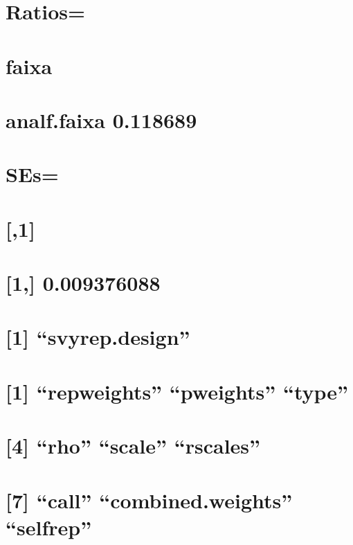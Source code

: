\documentclass[]{book}
\theoremstyle{definition}
\theoremstyle{definition}
\theoremstyle{definition}
\theoremstyle{remark}
\begin{document}
\section{Ratios=}\label{ratios-4}

\section{faixa}\label{faixa-4}

\section{analf.faixa 0.118689}\label{analf.faixa-0.118689-2}

\section{SEs=}\label{ses-4}

\section{{[},1{]}}\label{section-13}

\section{{[}1,{]} 0.009376088}\label{section-14}

\section{\texorpdfstring{{[}1{]}
``svyrep.design''}{{[}1{]} svyrep.design}}\label{svyrep.design}

\section{\texorpdfstring{{[}1{]} ``repweights'' ``pweights''
``type''}{{[}1{]} repweights pweights type}}\label{repweights-pweights-type}

\section{\texorpdfstring{{[}4{]} ``rho'' ``scale''
``rscales''}{{[}4{]} rho scale rscales}}\label{rho-scale-rscales}

\section{\texorpdfstring{{[}7{]} ``call'' ``combined.weights''
``selfrep''}{{[}7{]} call combined.weights selfrep}}\label{call-combined.weights-selfrep}
\end{document}
